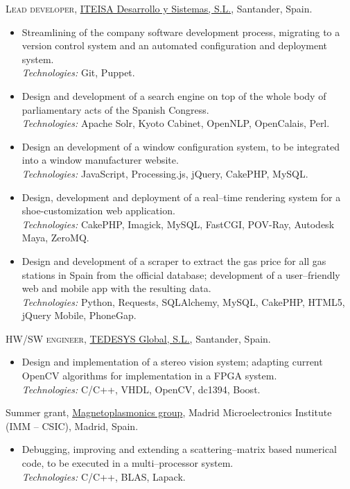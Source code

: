 \documentclass[11pt]{article}
\newcommand{\years}[1]{\marginnote{\scriptsize #1}}
\begin{document}
\years{2011--2013}\textsc{Lead developer}, \href{http://www.iteisa.com}{ITEISA Desarrollo y Sistemas, S.L.}, Santander, Spain.
\begin{itemize}
	\item  Streamlining of the company software development process, migrating to a version control system and an automated configuration and deployment system.\\
	\textit{Technologies:} Git, Puppet.
	\item  Design and development of a search engine on top of the whole body of parliamentary acts of the Spanish Congress.\\
	\textit{Technologies:} Apache Solr, Kyoto Cabinet, OpenNLP, OpenCalais, Perl.
	\item  Design an development of a window configuration system, to be integrated into a window manufacturer website.\\
	\textit{Technologies:} JavaScript, Processing.js, jQuery, CakePHP, MySQL.
	\item  Design, development and deployment of a real--time rendering system for a shoe-customization web application.\\
	\textit{Technologies:} CakePHP, Imagick, MySQL, FastCGI, POV-Ray, Autodesk Maya, ZeroMQ.
	\item  Design and development of a scraper to extract the gas price for all gas stations in Spain from the official database; development of a user--friendly web and mobile app with the resulting data.\\
	\textit{Technologies:} Python, Requests, SQLAlchemy, MySQL, CakePHP, HTML5, jQuery Mobile, PhoneGap.
\end{itemize}

\years{2011}\textsc{HW/SW engineer}, \href{http://www.tedesys.com}{TEDESYS Global, S.L.}, Santander, Spain.
\begin{itemize}
	\item  Design and implementation of a stereo vision system; adapting current OpenCV algorithms for implementation in a FPGA system.\\
	\textit{Technologies:} C/C++, VHDL, OpenCV, dc1394, Boost.
\end{itemize}

\years{2008,2009}Summer grant, \href{http://www.imm.cnm.csic.es/magnetoplasmonics}{Magnetoplasmonics group}, Madrid Microelectronics Institute (IMM -- CSIC), Madrid, Spain.
\begin{itemize}
	\item  Debugging, improving and extending a scattering--matrix based numerical code, to be executed in a multi--processor system.\\
	\textit{Technologies:} C/C++, BLAS, Lapack.
\end{itemize}
\end{document}
